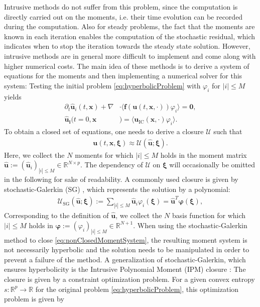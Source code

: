 Intrusive methods do not suffer from this problem, since the computation is directly carried out on the moments, i.e. their time evolution can be recorded during the computation. Also for steady problems, the fact that the moments are known in each iteration enables the computation of the stochastic residual, which indicates when to stop the iteration towards the steady state solution. However, intrusive methods are in general more difficult to implement and come along with higher numerical costs. The main idea of these methods is to derive a system of equations for the moments and then implementing a numerical solver for this system: Testing the initial problem \eqref{eq:hyperbolicProblem} with $\varphi_i$ for $|i|\leq M$ yields
\begin{subequations}\label{eq:nonClosedMomentSystem}
\begin{align}
\partial_t \bm{\hat u}_i(t,\bm{x}) + \nabla&\cdot\langle\bm{f}(\bm{u}(t,\bm{x},\cdot)) \varphi_i\rangle = \bm{0}, \\
\bm{\hat u_i}(t=0,\bm{x}&) = \langle\bm{u}_{\text{IC}}(\bm{x},\cdot)\varphi_i\rangle.
\end{align}
\end{subequations}
To obtain a closed set of equations, one needs to derive a closure $\mathcal{U}$ such that 
\begin{align*}
\bm{u}(t,\bm x,\bm \xi) \approx \mathcal{U}(\bm{\hat u};\bm\xi).
\end{align*}
Here, we collect the $N$ moments for which $\vert i \vert \leq M$ holds in the moment matrix $\bm{\hat{u}}:=(\bm{\hat{u}}_i)_{|i|\leq M}\in\mathbb{R}^{N \times p}$. The dependency of $\mathcal{U}$ on $\bm \xi$ will occasionally be omitted in the following for sake of readability. A commonly used closure is given by stochastic-Galerkin (SG) \cite{ghanem2003stochastic}, which represents the solution by a polynomial:
\begin{align}\label{eq:SGClosure}
\mathcal{U}_{\text{SG}}(\bm{\hat u};\bm\xi):= \sum_{|i|\leq M} \bm{\hat{u}}_i\varphi_i(\bm{\xi}) = \hat{\bm u}^T\bm{\varphi}(\bm\xi),
\end{align}
Corresponding to the definition of $\bm{\hat u}$, we collect the $N$ basis function for which $\vert i \vert \leq M$ holds in $\bm{\varphi}:=(\varphi_i)_{|i|\leq M}\in\mathbb{R}^{N+1}$. When using the stochastic-Galerkin method to close \eqref{eq:nonClosedMomentSystem}, the resulting moment system is not necessarily hyperbolic \cite{poette2009uncertainty} and the solution needs to be manipulated \cite{schlachter2018hyperbolicity} in order to prevent a failure of the method. A generalization of stochastic-Galerkin, which ensures hyperbolicity is the Intrusive Polynomial Moment (IPM) closure \cite{poette2009uncertainty}: The closure is given by a constraint optimization problem. For a given convex entropy $s:\mathbb{R}^p\to\mathbb{R}$ for the original problem \eqref{eq:hyperbolicProblem}, this optimization problem is given by
